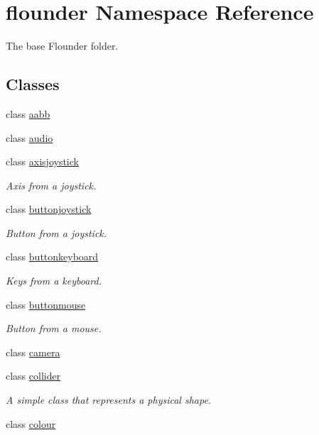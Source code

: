 \hypertarget{namespaceflounder}{}\section{flounder Namespace Reference}
\label{namespaceflounder}


The base Flounder folder.  


\subsection*{Classes}
\begin{DoxyCompactItemize}
\item 
class \hyperlink{classflounder_1_1aabb}{aabb}
\item 
class \hyperlink{classflounder_1_1audio}{audio}
\item 
class \hyperlink{classflounder_1_1axisjoystick}{axisjoystick}
\begin{DoxyCompactList}\small\item\em Axis from a joystick. \end{DoxyCompactList}\item 
class \hyperlink{classflounder_1_1buttonjoystick}{buttonjoystick}
\begin{DoxyCompactList}\small\item\em Button from a joystick. \end{DoxyCompactList}\item 
class \hyperlink{classflounder_1_1buttonkeyboard}{buttonkeyboard}
\begin{DoxyCompactList}\small\item\em Keys from a keyboard. \end{DoxyCompactList}\item 
class \hyperlink{classflounder_1_1buttonmouse}{buttonmouse}
\begin{DoxyCompactList}\small\item\em Button from a mouse. \end{DoxyCompactList}\item 
class \hyperlink{classflounder_1_1camera}{camera}
\item 
class \hyperlink{classflounder_1_1collider}{collider}
\begin{DoxyCompactList}\small\item\em A simple class that represents a physical shape. \end{DoxyCompactList}\item 
class \hyperlink{classflounder_1_1colour}{colour}

\end{DoxyCompactItemize}
